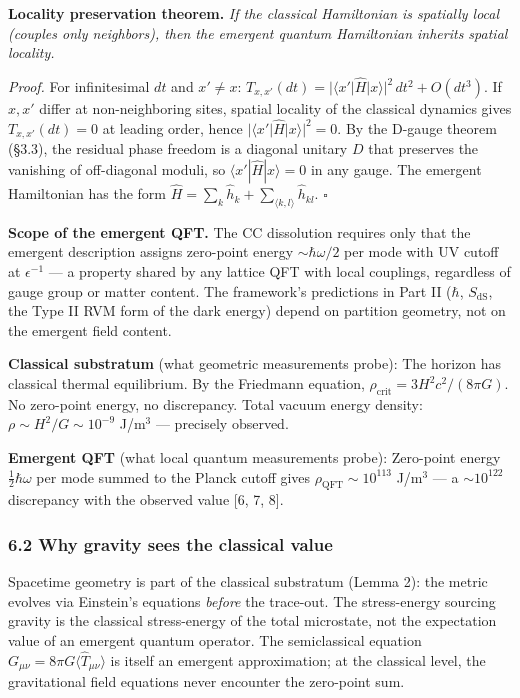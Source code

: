 \documentclass[
]{article}
\begin{document}
\textbf{Locality preservation theorem.} \emph{If the classical
Hamiltonian is spatially local (couples only neighbors), then the
emergent quantum Hamiltonian inherits spatial locality.}

\emph{Proof.} For infinitesimal \(dt\) and \(x' \neq x\):
\(T_{x,x'}(dt) = |\langle x'|\hat{H}|x\rangle|^2\,dt^2 + O(dt^3)\). If
\(x, x'\) differ at non-neighboring sites, spatial locality of the
classical dynamics gives \(T_{x,x'}(dt) = 0\) at leading order, hence
\(|\langle x'|\hat{H}|x\rangle|^2 = 0\). By the D-gauge theorem (§3.3),
the residual phase freedom is a diagonal unitary \(D\) that preserves
the vanishing of off-diagonal moduli, so
\(\langle x'|\hat{H}|x\rangle = 0\) in any gauge. The emergent
Hamiltonian has the form
\(\hat{H} = \sum_k \hat{h}_k + \sum_{\langle k,l\rangle} \hat{h}_{kl}\).
\(\square\)

\textbf{Scope of the emergent QFT.} The CC dissolution requires only
that the emergent description assigns zero-point energy
\(\sim \hbar\omega/2\) per mode with UV cutoff at \(\epsilon^{-1}\) ---
a property shared by any lattice QFT with local couplings, regardless of
gauge group or matter content. The framework's predictions in Part II
(\(\hbar\), \(S_{\text{dS}}\), the Type II RVM form of the dark energy)
depend on partition geometry, not on the emergent field content.

\textbf{Classical substratum} (what geometric measurements probe): The
horizon has classical thermal equilibrium. By the Friedmann equation,
\(\rho_{\text{crit}} = 3H^2 c^2/(8\pi G)\). No zero-point energy, no
discrepancy. Total vacuum energy density:
\(\rho \sim H^2/G \sim 10^{-9}\) J/m\(^3\) --- precisely observed.

\textbf{Emergent QFT} (what local quantum measurements probe):
Zero-point energy \(\frac{1}{2}\hbar\omega\) per mode summed to the
Planck cutoff gives \(\rho_{\text{QFT}} \sim 10^{113}\) J/m\(^3\) --- a
\(\sim 10^{122}\) discrepancy with the observed value {[}6, 7, 8{]}.

\hypertarget{why-gravity-sees-the-classical-value}{%
\subsubsection{6.2 Why gravity sees the classical
value}\label{why-gravity-sees-the-classical-value}}

Spacetime geometry is part of the classical substratum (Lemma 2): the
metric evolves via Einstein's equations \emph{before} the trace-out. The
stress-energy sourcing gravity is the classical stress-energy of the
total microstate, not the expectation value of an emergent quantum
operator. The semiclassical equation
\(G_{\mu\nu} = 8\pi G \langle \hat{T}_{\mu\nu} \rangle\) is itself an
emergent approximation; at the classical level, the gravitational field
equations never encounter the zero-point sum.
\end{document}
